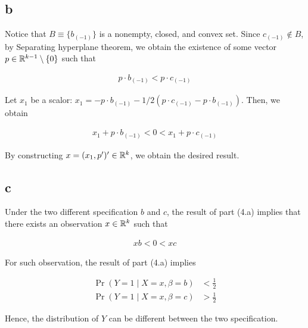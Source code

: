 \documentclass[11pt]{article}
\begin{document}
\subsection*{b}\label{q:4_b}

Notice that $B \equiv \{b_{(-1)}\}$ is a nonempty, closed, and convex set. Since $c_{(-1)} \notin B$, by Separating hyperplane theorem, we obtain the existence of some vector $p \in \mathbb{R}^{k-1}\setminus \{0\}$ such that

\begin{align*}
    p \cdot b_{(-1)} < p \cdot c_{(-1)}
\end{align*}

Let $x_1$ be a scalor: $x_1 = - p \cdot b_{(-1)} - 1/2 (p\cdot c_{(-1)} - p \cdot b_{(-1)})$. Then, we obtain

\begin{align*}
    x_1 + p \cdot b_{(-1)} < 0 < x_1 + p \cdot c_{(-1)}
\end{align*}

By constructing $x = (x_1, p^\prime)^\prime \in \mathbb{R}^k$, we obtain the desired result.

\subsection*{c}

Under the two different specification $b$ and $c$, the result of part (4.a) implies that there exists an observation $x \in \mathbb{R}^k$ such that

\begin{align*}
    xb < 0 < xc
\end{align*}

For such observation, the result of part (4.a) implies

\begin{align*}
    \Pr(Y = 1 \mid X = x, \beta = b) &< \frac{1}{2} \\
    \Pr(Y = 1 \mid X = x, \beta = c) &> \frac{1}{2}
\end{align*}

Hence, the distribution of $Y$ can be different between the two specification.
\end{document}
